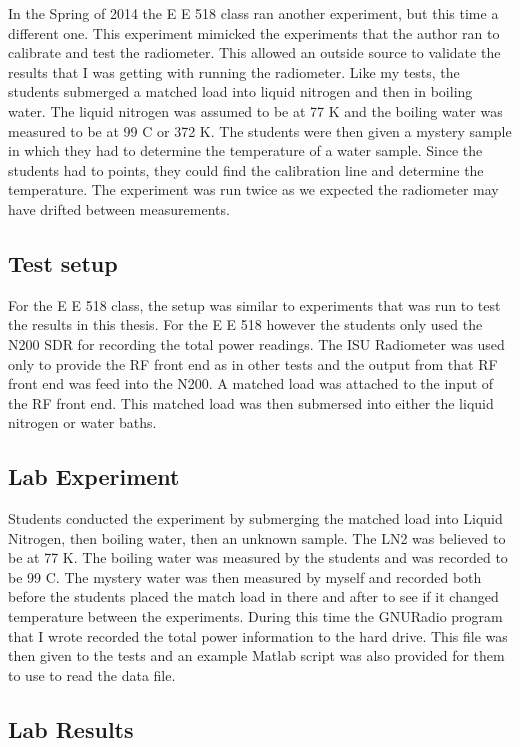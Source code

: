 In the Spring of 2014 the E E 518 class ran another experiment, but this time a different one.  This experiment mimicked the experiments that the author ran to calibrate and test the radiometer.  This allowed an outside source to validate the results that I was getting with running the radiometer.  Like my tests, the students submerged a matched load into liquid nitrogen and then in boiling water.  The liquid nitrogen was assumed to be at 77 K and the boiling water was measured to be at 99 C or 372 K.  The students were then given a mystery sample in which they had to determine the temperature of a water sample.  Since the students had to points, they could find the calibration line and determine the temperature.  The experiment was run twice as we expected the radiometer may have drifted between measurements.  

\subsection{Test setup}
For the E E 518 class, the setup was similar to experiments that was run to test the results in this thesis.  For the E E 518 however the students only used the N200 SDR for recording the total power readings.  The ISU Radiometer was used only to provide the RF front end as in other tests and the output from that RF front end was feed into the N200.  A matched load was attached to the input of the RF front end.  This matched load was then submersed into either the liquid nitrogen or water baths.  

\subsection{Lab Experiment}

Students conducted the experiment by submerging the matched load into Liquid Nitrogen, then boiling water, then an unknown sample.  The LN2 was believed to be at 77 K.  The boiling water was measured by the students and was recorded to be 99 C.  The mystery water was then measured by myself and recorded both before the students placed the match load in there and after to see if it changed temperature between the experiments.  During this time the GNURadio program that I wrote recorded the total power information to the hard drive.  This file was then given to the tests and an example Matlab script was also provided for them to use to read the data file.

\subsection{Lab Results}

